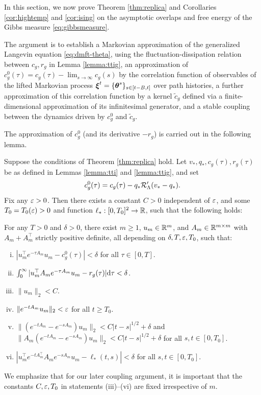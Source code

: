 In this section, we now prove Theorem \ref{thm:replica} and
Corollaries \ref{cor:hightemp} and \ref{cor:ising}
on the asymptotic overlaps and free energy of the Gibbs measure \eqref{eq:gibbsmeasure}.

The argument is to establish a Markovian approximation of the generalized
Langevin
equation \eqref{eq:dmft-theta}, using the fluctuation-dissipation relation between $c_g,r_g$ in
Lemma \ref{lemma:ttig}, an approximation of $c_g^0(\tau)=c_g(\tau)-\lim_{s \to \infty}
c_g(s)$ by the correlation function
of observables of the lifted Markovian process
$\boldsymbol{\xi}^t=\{\boldsymbol{\theta}^s\}_{s \in [t-B,t]}$ over path histories, a further
approximation of this correlation function by a kernel $\tilde c_g$ defined
via a finite-dimensional approximation of its infinitesimal generator,
and a stable coupling between the dynamics driven by $c_g^0$ and $\tilde c_g$.

The approximation of $c_g^0$ (and its derivative ${-}r_g$) is carried out in the
following lemma.

\begin{lemma}\label{lemma:semigroupapprox}
Suppose the conditions of Theorem \ref{thm:replica} hold. Let
$v_*,q_*,c_g(\tau),r_g(\tau)$ be as defined in Lemmas \ref{lemma:tti} and
\ref{lemma:ttig}, and set
\[c_g^0(\tau)=c_g(\tau)-q_*\mathcal{R}_\Lambda'(v_*-q_*).\]
Fix any $\varepsilon>0$. Then there exists a constant $C>0$
independent of $\varepsilon$, and some $T_0=T_0(\varepsilon)>0$
and function $\ell_*:[0,T_0]^2 \to \mathbb{R}$, such that the following holds: 

For any $T>0$ and $\delta>0$, there exist
$m \geq 1$, $u_m \in \mathbb{R}^m$, and $A_m \in \mathbb{R}^{m \times m}$ with
$A_m+A_m^\top$ strictly positive definite,
all depending on $\delta,T,\varepsilon,T_0$, such that:
\begin{enumerate}[(i)]
\item $|u_m^\top e^{-\tau A_m}u_m
-c_g^0(\tau)|<\delta$ for all $\tau \in [0,T]$.
\item $\int_0^\infty |u_m^\top A_me^{-\tau A_m}u_m- r_g(\tau)|\mathrm{d} \tau<\delta$.
\item $\|u_m\|_2<C$.
\item $\|e^{-tA_m}u_m\|_2<\varepsilon$ for all $t \geq T_0$.
\item $\|(e^{-tA_m}-e^{-sA_m})u_m\|_2<C|t-s|^{1/2}+\delta$
and $\|A_m(e^{-tA_m}-e^{-sA_m})u_m\|_2<C|t-s|^{1/2}+\delta$
for all $s,t \in [0,T_0]$.
\item $|u_m^\top e^{-tA_m^\top}A_me^{-sA_m}u_m-\ell_*(t,s)|<\delta$
for all $s,t \in [0,T_0]$.
\end{enumerate}
\end{lemma}
We emphasize that for our later coupling argument, it is important that the
constants $C,\varepsilon,T_0$ in statements (iii)--(vi) are fixed irrespective of $m$.

